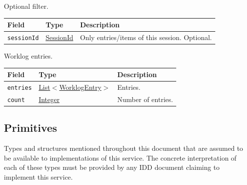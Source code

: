 \documentclass[a4paper]{arrowhead}
\newcommand{\mref}[1]{{\textcolor{ArrowheadPurple}{\hyperref[sec:model:#1]{#1}}}}
\newcommand{\pref}[1]{{\textcolor{ArrowheadGrey}{\hyperref[sec:model:primitives:#1]{#1}}}}
\begin{document}
Optional filter.

{\small
\begin{longtable}{|p{3.9cm}|p{4.4cm}|p{7.5cm}|}

\hline
\rowcolor{gray!33} Field & Type & Description \\ \hline
\endhead
\texttt{sessionId} & \pref{SessionId} & Only entries/items of this session. Optional. \\ \hline
\end{longtable}
}

Worklog entries.

{\small
\begin{longtable}{|p{3.9cm}|p{4.4cm}|p{7.5cm}|}

\hline
\rowcolor{gray!33} Field & Type & Description \\ \hline
\endhead
\texttt{entries} & \pref{List}$<$\mref{WorklogEntry}$>$ & Entries. \\ \hline
\texttt{count} & \pref{Integer} & Number of entries. \\ \hline
\end{longtable}
}


\subsection{Primitives}
\label{sec:model:primitives}
Types and structures mentioned throughout this document that are assumed to be available to implementations of this
service. The concrete interpretation of each of these types must be provided by any IDD document claiming to implement
this service.
\end{document}
